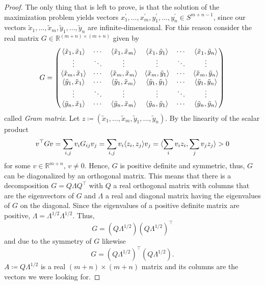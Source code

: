 \begin{proof}
		The only thing that is left to prove, is that the solution of the maximization problem yields vectors $x_1^\prime,\dots,x_m^\prime, y_1^\prime,\dots,y_n^\prime\in S^{m+n-1}$, since our vectors $\tilde{x}_1,\dots,\tilde{x}_m,\tilde{y}_1,\dots,\tilde{y}_n$ are infinite-dimensional. 
		For this reason consider the real matrix $G\in\mathbb{R}^{(m+n)\times(m+n)}$ given by
		\begin{equation}
			G=\begin{pmatrix}
				\langle{\tilde{x}_1},{\tilde{x}_1}\rangle & \cdots & \langle{\tilde{x}_1},{\tilde{x}_m}\rangle& \langle{\tilde{x}_1},{\tilde{y}_1}\rangle & \cdots & \langle{\tilde{x}_1},{\tilde{y}_n}\rangle \\
				 \vdots		& \ddots	& \vdots & \vdots & \ddots & \vdots\\
				 \langle{\tilde{x}_m},{\tilde{x}_1}\rangle & \cdots & \langle{\tilde{x}_m},{\tilde{x}_m}\rangle& \langle{\tilde{x}_m},{\tilde{y}_1}\rangle & \cdots & \langle{\tilde{x}_m},{\tilde{y}_n}\rangle \\
				\langle{\tilde{y}_1},{\tilde{x}_1}\rangle & \cdots & \langle{\tilde{y}_1},{\tilde{x}_m}\rangle& \langle{\tilde{y}_1},{\tilde{y}_1}\rangle & \cdots & \langle{\tilde{y}_1},{\tilde{y}_n}\rangle \\
				 \vdots		& \ddots	& \vdots& \vdots & \ddots & \vdots\\
				 \langle{\tilde{y}_n},{\tilde{x}_1}\rangle & \cdots & \langle{\tilde{y}_n},{\tilde{x}_m}\rangle& \langle{\tilde{y}_n},{\tilde{y}_1}\rangle & \cdots & \langle{\tilde{y}_n},{\tilde{y}_n}\rangle 
			\end{pmatrix}
		\end{equation}
		called \emph{Gram matrix}. Let $z\coloneqq (\tilde{x}_1,\dots,\tilde{x}_m,\tilde{y}_1,\dots,\tilde{y}_n)$. By the linearity of the scalar product
		\begin{align*}
			v^\top G v = \sum_{i,j} v_i G_{ij} v_j 
			= \sum_{i,j} v_i \langle{z_i},{z_j}\rangle v_j 
			= \langle{\sum_i v_i z_i},{\sum_j v_j z_j}\rangle 
			> 0
		\end{align*}
		for some $v\in\mathbb{R}^{m+n}$, $v\neq 0$. Hence, $G$ is positive definite and symmetric, thus, $G$ can be diagonalized by an orthogonal matrix. This means that there is a decomposition $G=Q\Lambda Q^\top$ with $Q$ a real orthogonal matrix with columns that are the eigenvectors of $G$ and $\Lambda$ a real and diagonal matrix having the eigenvalues of $G$ on the diagonal. Since the eigenvalues of a positive definite matrix are positive, $\Lambda=\Lambda^{1/2}\Lambda^{1/2}$. Thus,
		\[
			G=(Q\Lambda^{1/2})(Q\Lambda^{1/2})^\top		
		\]
		and due to the symmetry of $G$ likewise
		\[
			G=(Q\Lambda^{1/2})^\top(Q\Lambda^{1/2}).	
		\]
		$A\coloneqq Q\Lambda^{1/2}$ is a real $(m+n)\times (m+n)$ matrix and its columns are the vectors we were looking for.
	\end{proof}
	
